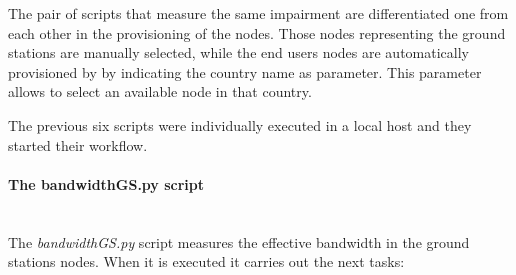 The pair of scripts that measure the same impairment are differentiated one from each other in the provisioning of the nodes. Those nodes representing the ground stations are manually selected, while the end users nodes are automatically provisioned by \nepi by indicating the country name as parameter. This parameter allows \nepi to select an available node in that country.

The previous six scripts were individually executed in a local host and they started their workflow.

\paragraph{The bandwidthGS.py script}~\\

The \emph{bandwidthGS.py}  script measures the effective bandwidth in the ground
stations nodes. When it is executed it carries out the next tasks:
